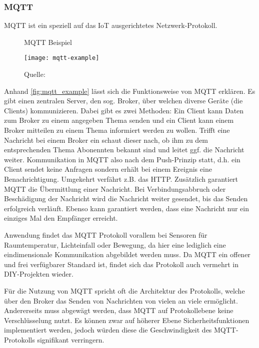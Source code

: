 \subsubsection{MQTT}

\ac{MQTT} ist ein speziell auf das \ac{IoT} ausgerichtetes Netzwerk-Protokoll.

\begin{figure}[ht]
	\centering
	\caption{MQTT Beispiel}
	\texttt{[image: mqtt-example]}
	\caption*{\footnotesize{Quelle: }}
	\label{fig:mqtt_example}
\end{figure}

Anhand \autoref{fig:mqtt_example} lässt sich die Funktionsweise von \ac{MQTT} erklären.
Es gibt einen zentralen Server, den sog. Broker, über welchen diverse Geräte (die Clients) kommunizieren.
Dabei gibt es zwei Methoden:
Ein Client kann Daten zum Broker zu einem angegeben Thema senden und ein Client kann einem Broker mitteilen zu einem Thema informiert werden zu wollen.
Trifft eine Nachricht bei einem Broker ein schaut dieser nach, ob ihm zu dem entsprechenden Thema Abonennten bekannt sind und leitet ggf. die Nachricht weiter.
Kommunikation in \ac{MQTT} also nach dem Push-Prinzip statt, d.h. ein Client sendet keine Anfragen sondern erhält bei einem Ereignis eine Benachrichtigung.
Umgekehrt verfährt z.B. das \ac{HTTP}.
Zusätzlich garantiert \ac{MQTT} die Übermittlung einer Nachricht.
Bei Verbindungsabbruch oder Beschädigung der Nachricht wird die Nachricht weiter gesendet, bis das Senden erfolgreich verläuft.
Ebenso kann garantiert werden, dass eine Nachricht nur ein einziges Mal den Empfänger erreicht.

Anwendung findet das \ac{MQTT} Protokoll vorallem bei Sensoren für Raumtemperatur, Lichteinfall oder Bewegung, da hier eine lediglich eine eindimensionale Kommunikation abgebildet werden muss.
Da \ac{MQTT} ein offener und frei verfügbarer Standard ist, findet sich das Protokoll auch vermehrt in \ac{DIY}-Projekten wieder.

Für die Nutzung von \ac{MQTT} spricht oft die Architektur des Protokolls, welche über den Broker das Senden von Nachrichten von vielen an viele ermöglicht.
Andererseits muss abgewägt werden, dass \ac{MQTT} auf Protokollebene keine Verschlüsselung nutzt.
Es können zwar auf höherer Ebene Sicherheitsfunktionen implementiert werden, jedoch würden diese die Geschwindigkeit des \ac{MQTT}-Protokolls signifikant verringern.

